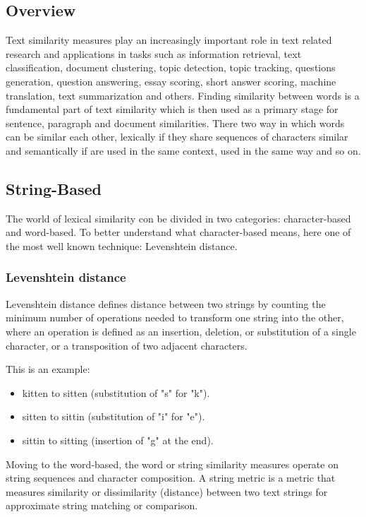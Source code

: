 \subsection{Overview}

Text similarity measures play an increasingly important role in text related research and applications in tasks such as information retrieval, text classification, document clustering, topic detection, topic tracking, questions generation, question answering, essay scoring, short answer scoring, machine translation, text summarization and others. Finding similarity between words is a fundamental part of text similarity which is then used as a primary stage for sentence, paragraph and document similarities. There two way in which words can be similar each other, lexically if they share sequences of characters similar and  semantically if are used in the same context, used in the same way and so on. 


\subsection{String-Based}

The world of lexical similarity con be divided in two categories: character-based and word-based.
To better understand what character-based means, here one of the most well known technique: Levenshtein distance.
\subsubsection{ Levenshtein distance}
 Levenshtein distance defines distance between two strings by counting the minimum number of operations needed to transform one string into the other, where an operation is defined as an insertion, deletion, or substitution of a single character, or a transposition of two adjacent characters.

This is an example:

\begin{itemize}
    \item kitten to sitten (substitution of "s" for "k").
    \item sitten to sittin (substitution of "i" for "e").
    \item sittin to sitting (insertion of "g" at the end).
\end{itemize}

Moving to the word-based,  the word or string similarity measures operate on string sequences and character composition. A string metric is a metric that measures similarity or dissimilarity (distance) between two text strings for approximate string matching or comparison.

